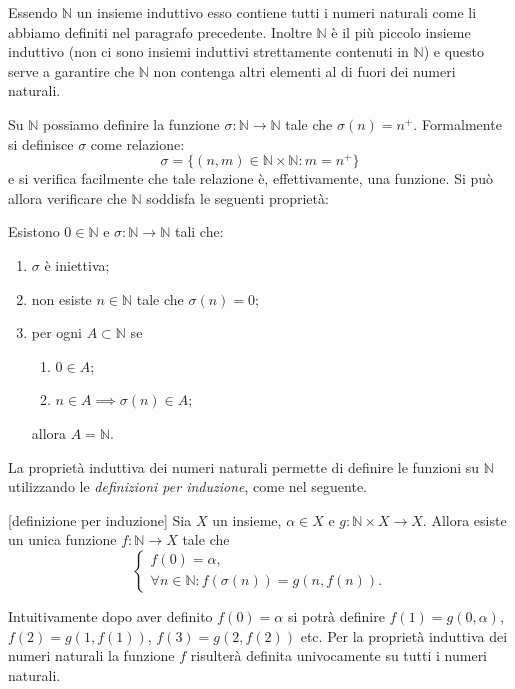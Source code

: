 \documentclass[italian,a4paper,hidelinks,headinclude]{scrartcl}
\newcommand{\NN}{{\mathbb N}}
\begin{document}
Essendo $\NN$ un insieme induttivo esso contiene tutti i numeri naturali come
li abbiamo definiti nel paragrafo precedente.
Inoltre $\NN$ è il più piccolo insieme induttivo
(non ci sono insiemi induttivi strettamente contenuti in $\NN$) e questo
serve a garantire che $\NN$ non contenga altri elementi al di fuori dei numeri
naturali.

Su $\NN$ possiamo definire la funzione $\sigma \colon \NN \to \NN$
tale che $\sigma(n) = n^+$. Formalmente si definisce $\sigma$ come relazione:
\[
  \sigma = \{(n,m) \in \NN \times \NN\colon m = n^+\}
\]
e si verifica facilmente che tale relazione è, effettivamente, una funzione.
Si può allora verificare che $\NN$ soddisfa le seguenti proprietà:
\begin{theorem}
Esistono $0\in \NN$
e $\sigma\colon \NN \to \NN$ tali che:
\begin{enumerate}
\item $\sigma$ è iniettiva;
\item non esiste $n\in \NN$ tale che $\sigma(n)=0$;
\item per ogni $A\subset \NN$ se
\begin{enumerate}
   \item $0\in A$;
   \item $n\in A \implies \sigma(n) \in A$;
\end{enumerate}
allora $A= \NN$.
\end{enumerate}
\end{theorem}

La proprietà induttiva dei numeri naturali permette di definire le funzioni su
$\NN$ utilizzando le \emph{definizioni per induzione}, come nel seguente.
\begin{theorem}\label{th:def_induction}[definizione per induzione]
Sia $X$ un insieme, $\alpha \in X$ e $g\colon \NN\times X \to X$.
Allora esiste un unica funzione $f\colon \NN \to X$ tale che
\[
\begin{cases}
  f(0) = \alpha,\\
  \forall n\in \NN\colon f(\sigma(n)) = g(n, f(n)).
\end{cases}
\]
\end{theorem}

Intuitivamente dopo aver definito $f(0) = \alpha$ si potrà definire
$f(1) = g(0, \alpha)$, $f(2) = g(1, f(1))$, $f(3) = g(2, f(2))$ etc.
Per la proprietà induttiva dei numeri naturali la funzione $f$ risulterà
definita univocamente su tutti i numeri naturali.
\end{document}

